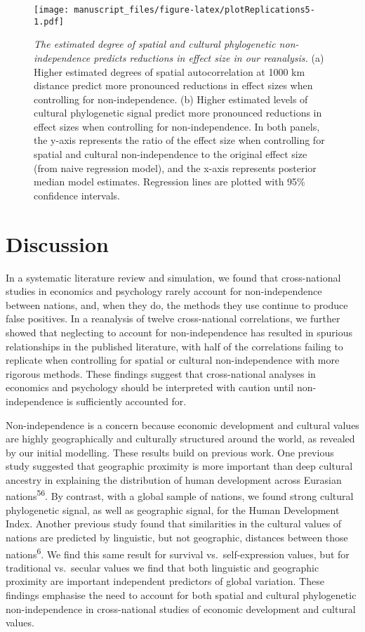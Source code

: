 \documentclass[
  english,
  man,floatsintext]{apa6}
\begin{document}
\begin{figure}
\centering
\texttt{[image: manuscript\_files/figure-latex/plotReplications5-1.pdf]}
\caption{\label{fig:plotReplications5}\emph{The estimated degree of spatial and cultural phylogenetic non-independence predicts reductions in effect size in our reanalysis.} (a) Higher estimated degrees of spatial autocorrelation at 1000 km distance predict more pronounced reductions in effect sizes when controlling for non-independence. (b) Higher estimated levels of cultural phylogenetic signal predict more pronounced reductions in effect sizes when controlling for non-independence. In both panels, the y-axis represents the ratio of the effect size when controlling for spatial and cultural non-independence to the original effect size (from naive regression model), and the x-axis represents posterior median model estimates. Regression lines are plotted with 95\% confidence intervals.}
\end{figure}

\hypertarget{discussion}{%
\section{Discussion}\label{discussion}}

In a systematic literature review and simulation, we found that cross-national studies in economics and psychology rarely account for non-independence between nations, and, when they do, the methods they use continue to produce false positives. In a reanalysis of twelve cross-national correlations, we further showed that neglecting to account for non-independence has resulted in spurious relationships in the published literature, with half of the correlations failing to replicate when controlling for spatial or cultural non-independence with more rigorous methods. These findings suggest that cross-national analyses in economics and psychology should be interpreted with caution until non-independence is sufficiently accounted for.

Non-independence is a concern because economic development and cultural values are highly geographically and culturally structured around the world, as revealed by our initial modelling. These results build on previous work. One previous study suggested that geographic proximity is more important than deep cultural ancestry in explaining the distribution of human development across Eurasian nations\textsuperscript{56}. By contrast, with a global sample of nations, we found strong cultural phylogenetic signal, as well as geographic signal, for the Human Development Index. Another previous study found that similarities in the cultural values of nations are predicted by linguistic, but not geographic, distances between those nations\textsuperscript{6}. We find this same result for survival vs.~self-expression values, but for traditional vs.~secular values we find that both linguistic and geographic proximity are important independent predictors of global variation. These findings emphasise the need to account for both spatial and cultural phylogenetic non-independence in cross-national studies of economic development and cultural values.
\end{document}

